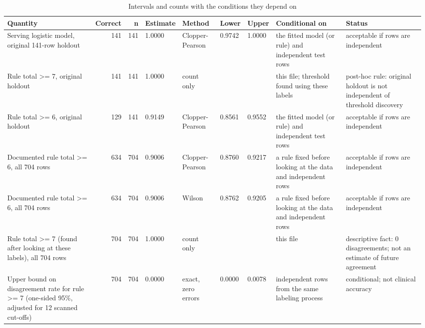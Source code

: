 \begin{table}
\caption{Intervals and counts with the conditions they depend on}
\label{tab:table5_intervals}
\begin{tabular}{lrrllllll}
\toprule
Quantity & Correct & n & Estimate & Method & Lower & Upper & Conditional on & Status \\
\midrule
Serving logistic model, original 141-row holdout & 141 & 141 & 1.0000 & Clopper-Pearson & 0.9742 & 1.0000 & the fitted model (or rule) and independent test rows & acceptable if rows are independent \\
Rule total >= 7, original holdout & 141 & 141 & 1.0000 & count only &  &  & this file; threshold found using these labels & post-hoc rule: original holdout is not independent of threshold discovery \\
Rule total >= 6, original holdout & 129 & 141 & 0.9149 & Clopper-Pearson & 0.8561 & 0.9552 & the fitted model (or rule) and independent test rows & acceptable if rows are independent \\
Documented rule total >= 6, all 704 rows & 634 & 704 & 0.9006 & Clopper-Pearson & 0.8760 & 0.9217 & a rule fixed before looking at the data and independent rows & acceptable if rows are independent \\
Documented rule total >= 6, all 704 rows & 634 & 704 & 0.9006 & Wilson & 0.8762 & 0.9205 & a rule fixed before looking at the data and independent rows & acceptable if rows are independent \\
Rule total >= 7 (found after looking at these labels), all 704 rows & 704 & 704 & 1.0000 & count only &  &  & this file & descriptive fact: 0 disagreements; not an estimate of future agreement \\
Upper bound on disagreement rate for rule >= 7 (one-sided 95\%, adjusted for 12 scanned cut-offs) & 704 & 704 & 0.0000 & exact, zero errors & 0.0000 & 0.0078 & independent rows from the same labeling process & conditional; not clinical accuracy \\
\bottomrule
\end{tabular}
\end{table}
